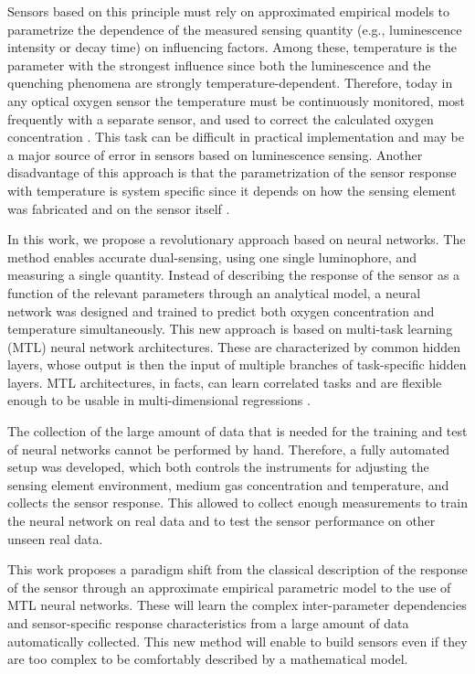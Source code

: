 \documentclass[9pt,twocolumn,twoside,pdftex]{optica}
\begin{document}
Sensors based on this principle must rely on approximated empirical models to parametrize the dependence of the measured sensing quantity (e.g., luminescence intensity or decay time) on influencing factors. Among these, temperature is the parameter with the strongest influence since both the luminescence and the quenching phenomena are strongly temperature-dependent. Therefore, today in any optical oxygen sensor the temperature must be continuously monitored, most frequently with a separate sensor, and used to correct the calculated oxygen concentration \cite{Li2015}. This task can be difficult in practical implementation and may be a major source of error in sensors based on luminescence sensing. Another disadvantage of this approach is that the parametrization of the sensor response with temperature is system specific since it depends  on how the sensing element was fabricated and on the sensor itself \cite{Xu1994,Draxler1995,Hartmann1996,Mills1998,Badocco2008,Dini2011}.

In this work, we propose a revolutionary approach based on neural networks. The method enables accurate dual-sensing, using one single luminophore, and measuring a single quantity.
Instead of describing the response of the sensor as a function of the relevant parameters through an analytical model, a neural network  was designed and trained to predict both oxygen concentration and temperature simultaneously.
This new approach is based on multi-task learning (MTL) neural network architectures. These are characterized by common hidden layers, whose output is then the input of multiple branches of task-specific hidden layers. MTL architectures, in facts, can learn correlated tasks \cite{Argyriou2006, Thrun1996, Caruana1997, Zhang2017, Baxter2000, Thung2018} and are flexible enough to be usable in multi-dimensional regressions \cite{Michelucci2019_2}.

The collection of the large amount of data that is needed for the training and test of neural networks cannot be performed by hand. Therefore, a fully automated setup was developed, which both controls the instruments for adjusting the sensing element environment, medium gas concentration and temperature, and collects the sensor response. This allowed to collect enough measurements to train the neural network on real data and to test the sensor performance on other unseen real data.

This work proposes a paradigm shift from the classical description of the response of the sensor through an approximate empirical parametric model to the use of MTL neural networks. 
These will learn the complex inter-parameter dependencies and sensor-specific response characteristics from a large amount of data automatically collected. This new method will enable to build sensors even if they are too complex to be comfortably described by a mathematical model.
\end{document}
